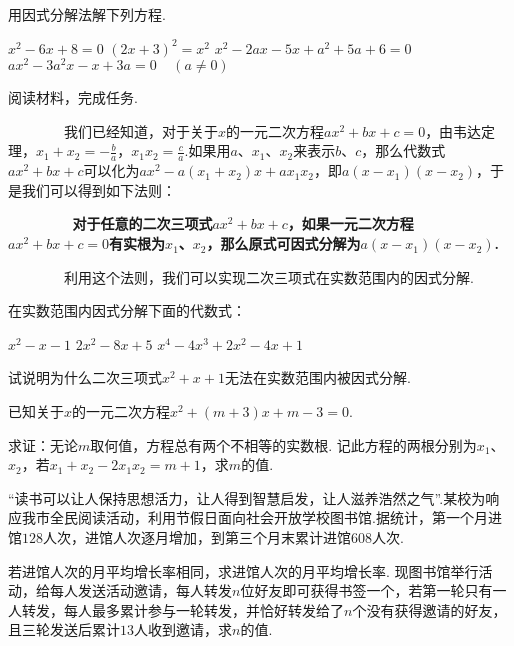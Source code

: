\documentclass[10pt]{article}
\begin{document}
\begin{questions}{\answeringintroduction}
    \question 用因式分解法解下列方程.
    \begin{subquestions}
        \subquestion $x^2-6x+8=0$
        \subquestion $(2x+3)^2=x^2$
        \subquestion $x^2-2ax-5x+a^2+5a+6=0$
        \subquestion $ax^2-3a^2x-x+3a=0 \ \ \ \ \ (a \neq 0)$
    \end{subquestions}
    \addspace{}
    \question 阅读材料，完成任务.\par
    ~~~~~~~~我们已经知道，对于关于$x$的一元二次方程$ax^2+bx+c=0$，由韦达定理，${x_1+x_2=-\frac{b}{a}}$，${x_1x_2=\frac{c}{a}}$.如果用$a$、$x_1$、$x_2$来表示$b$、$c$，那么代数式$ax^2+bx+c$可以化为$ax^2-a(x_1+x_2)x+ax_1x_2$，即$a(x-x_1)(x-x_2)$，于是我们可以得到如下法则：\par
    \textbf{~~~~~~~~对于任意的二次三项式$ax^2+bx+c$，如果一元二次方程$ax^2+bx+c=0$有实根为$x_1$、$x_2$，那么原式可因式分解为$a(x-x_1)(x-x_2)$.}\par
    ~~~~~~~~利用这个法则，我们可以实现二次三项式在实数范围内的因式分解.
    \begin{subquestions}
        \subquestion 在实数范围内因式分解下面的代数式：
        \begin{subsubquestions}
            \subsubquestion $x^2-x-1$
            \subsubquestion $2x^2-8x+5$
            \subsubquestion $x^4-4x^3+2x^2-4x+1$
        \end{subsubquestions}
        \subquestion 试说明为什么二次三项式$x^2+x+1$无法在实数范围内被因式分解.
    \end{subquestions}
    \newpage
    \question 已知关于$x$的一元二次方程$x^2+(m+3)x+m-3=0$.
    \begin{subquestions}
        \subquestion 求证：无论$m$取何值，方程总有两个不相等的实数根.
        \subquestion 记此方程的两根分别为$x_1$、$x_2$，若$x_1+x_2-2x_1x_2=m+1$，求$m$的值.
    \end{subquestions}
    \addspace{}
    \question ``读书可以让人保持思想活力，让人得到智慧启发，让人滋养浩然之气''.某校为响应我市全民阅读活动，利用节假日面向社会开放学校图书馆.据统计，第一个月进馆$128$人次，进馆人次逐月增加，到第三个月末累计进馆$608$人次.
    \begin{subquestions}
        \subquestion 若进馆人次的月平均增长率相同，求进馆人次的月平均增长率.
        \subquestion 现图书馆举行活动，给每人发送活动邀请，每人转发$n$位好友即可获得书签一个，若第一轮只有一人转发，每人最多累计参与一轮转发，并恰好转发给了$n$个没有获得邀请的好友，且三轮发送后累计$13$人收到邀请，求$n$的值.
    \end{subquestions}

\end{questions}
\end{document}
